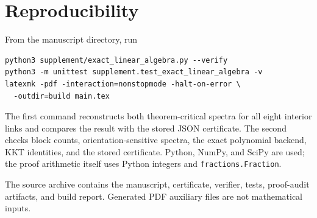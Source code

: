\section{Reproducibility}
\label{app:repro}

From the manuscript directory, run
\begin{verbatim}
python3 supplement/exact_linear_algebra.py --verify
python3 -m unittest supplement.test_exact_linear_algebra -v
latexmk -pdf -interaction=nonstopmode -halt-on-error \
  -outdir=build main.tex
\end{verbatim}
The first command reconstructs both theorem-critical spectra for all eight
interior links and compares the result with the stored JSON certificate.  The
second checks block counts, orientation-sensitive spectra, the exact
polynomial backend, KKT identities, and the stored certificate.  Python,
NumPy, and SciPy are used; the proof arithmetic itself uses Python integers
and \texttt{fractions.Fraction}.

The source archive contains the manuscript, certificate, verifier, tests,
proof-audit artifacts, and build report.  Generated PDF auxiliary files are
not mathematical inputs.
